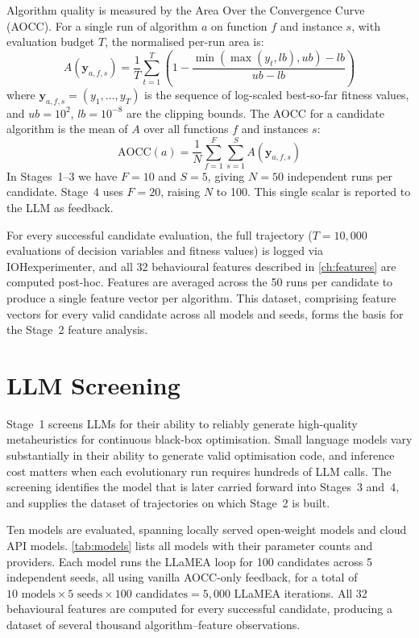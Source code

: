 Algorithm quality is measured by the Area Over the Convergence Curve (AOCC). For a single run of algorithm $a$ on function $f$ and instance $s$, with evaluation budget $T$, the normalised per-run area is:
\begin{equation}
\label{eq:per-run-area}
A(\mathbf{y}_{a,f,s}) = \frac{1}{T} \sum_{t=1}^{T} \left(1 - \frac{\min(\max(y_t, lb), ub) - lb}{ub - lb}\right)
\end{equation}
where $\mathbf{y}_{a,f,s} = (y_1, \ldots, y_T)$ is the sequence of log-scaled best-so-far fitness values, and $ub = 10^{2}$, $lb = 10^{-8}$ are the clipping bounds. The AOCC for a candidate algorithm is the mean of $A$ over all functions $f$ and instances $s$:
\begin{equation}
\label{eq:aocc}
\text{AOCC}(a) = \frac{1}{N} \sum_{f=1}^{F} \sum_{s=1}^{S} A(\mathbf{y}_{a,f,s})
\end{equation}
In Stages~1--3 we have $F = 10$ and $S = 5$, giving $N = 50$ independent runs per candidate. Stage~4 uses $F = 20$, raising $N$ to 100. This single scalar is reported to the LLM as feedback.

For every successful candidate evaluation, the full trajectory ($T = 10{,}000$ evaluations of decision variables and fitness values) is logged via IOHexperimenter, and all 32 behavioural features described in \cref{ch:features} are computed post-hoc. Features are averaged across the 50 runs per candidate to produce a single feature vector per algorithm. This dataset, comprising feature vectors for every valid candidate across all models and seeds, forms the basis for the Stage~2 feature analysis.

\section{LLM Screening}
\label{sec:meth-screening}

Stage~1 screens LLMs for their ability to reliably generate high-quality metaheuristics for continuous black-box optimisation. Small language models vary substantially in their ability to generate valid optimisation code, and inference cost matters when each evolutionary run requires hundreds of LLM calls. The screening identifies the model that is later carried forward into Stages~3 and~4, and supplies the dataset of trajectories on which Stage~2 is built.

Ten models are evaluated, spanning locally served open-weight models and cloud API models. \cref{tab:models} lists all models with their parameter counts and providers. Each model runs the LLaMEA loop for 100 candidates across 5 independent seeds, all using vanilla AOCC-only feedback, for a total of $10 \text{ models} \times 5 \text{ seeds} \times 100 \text{ candidates} = 5{,}000$ LLaMEA iterations. All 32 behavioural features are computed for every successful candidate, producing a dataset of several thousand algorithm--feature observations.

